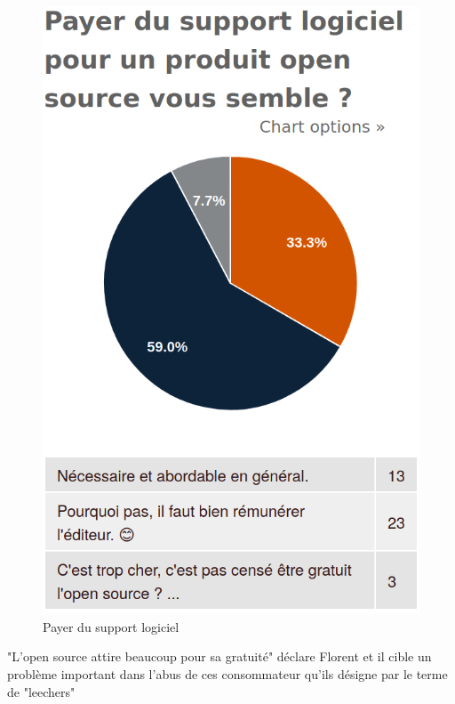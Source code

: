 			\begin{figure}[!htb]
				\center
				\includegraphics[scale=0.28]{./img/payersupport}
				\caption{Payer du support logiciel}					
			\end{figure}


			"L'open source attire beaucoup pour sa gratuité" déclare Florent  et il cible un problème important dans l'abus de ces consommateur qu'ils désigne par le terme de "\gls{leechers}"
			\begin{center}
					\textit{
					}
				\end{center}

